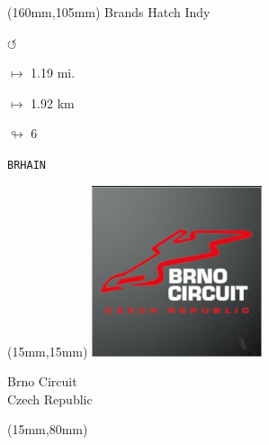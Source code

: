 \begin{textblock*}{40mm}(160mm,105mm)%
Brands Hatch Indy
\par \Huge$\circlearrowleft$
\Large
\par$\mapsto$ 1.19 mi.
\par$\mapsto$ 1.92 km
\par$\looparrowright$ 6
\par\hfill\tiny\tt BRHAIN\\
\end{textblock*}
\null\newpage

\begin{textblock*}{50mm}(15mm,15mm)%
\includegraphics[width=50mm]{LG/2015-05-20_00075.png}
\par Brno Circuit\\ Czech Republic
\end{textblock*}
\begin{textblock*}{185mm}(15mm,80mm)%
\end{textblock*}
